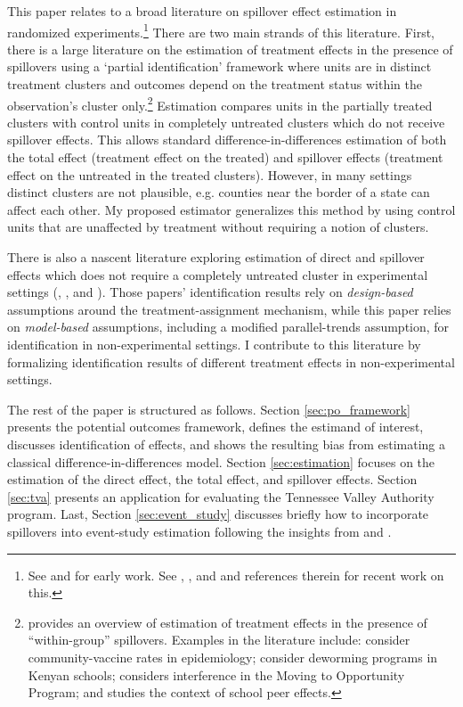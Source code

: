 \documentclass[11pt]{article}
\begin{document}
This paper relates to a broad literature on spillover effect estimation in randomized experiments.\footnote{See \citet{Sobel_2006} and \citet{Hudgens_Halloran_2008} for early work. See \citet{Hu_Li_Wager_2021}, \citet{Savje_Aronow_Hudgens_2021}, and \citet{Vazquez-Bare_2019} and references therein for recent work on this.} There are two main strands of this literature. First, there is a large literature on the estimation of treatment effects in the presence of spillovers using a `partial identification' framework where units are in distinct treatment clusters and outcomes depend on the treatment status within the observation's cluster only.\footnote{ \citet{Angelucci_DiMaro_2016} provides an overview of estimation of treatment effects in the presence of ``within-group'' spillovers. Examples in the literature include: \citet{Halloran_Struchiner_1995} consider community-vaccine rates in epidemiology; \citet{Miguel_Kremer_2004} consider deworming programs in Kenyan schools; \citet{Sobel_2006} considers interference in the Moving to Opportunity Program; and \citet{Angrist_2014} studies the context of school peer effects.} Estimation compares units in the partially treated clusters with control units in completely untreated clusters which do not receive spillover effects. This allows standard difference-in-differences estimation of both the total effect (treatment effect on the treated) and spillover effects (treatment effect on the untreated in the treated clusters). However, in many settings distinct clusters are not plausible, e.g. counties near the border of a state can affect each other. My proposed estimator generalizes this method by using control units that are unaffected by treatment without requiring a notion of clusters.

There is also a nascent literature exploring estimation of direct and spillover effects which does not require a completely untreated cluster in experimental settings (\citet{Savje_Aronow_Hudgens_2021}, \citet{Vazquez-Bare_2019}, and \citet{Hu_Li_Wager_2021}). Those papers' identification results rely on \emph{design-based} assumptions around the treatment-assignment mechanism, while this paper relies on \emph{model-based} assumptions, including a modified parallel-trends assumption, for identification in non-experimental settings. I contribute to this literature by formalizing identification results of different treatment effects in non-experimental settings. 

The rest of the paper is structured as follows. Section \ref{sec:po_framework} presents the potential outcomes framework, defines the estimand of interest, discusses identification of effects, and shows the resulting bias from estimating a classical difference-in-differences model. Section \ref{sec:estimation} focuses on the estimation of the direct effect, the total effect, and spillover effects. Section \ref{sec:tva} presents an application for evaluating the Tennessee Valley Authority program. Last, Section \ref{sec:event_study} discusses briefly how to incorporate spillovers into event-study estimation following the insights from \citet{Gardner_2021} and \citet{Borusyak_Jaravel_Spiess_2021}. 
\end{document}
